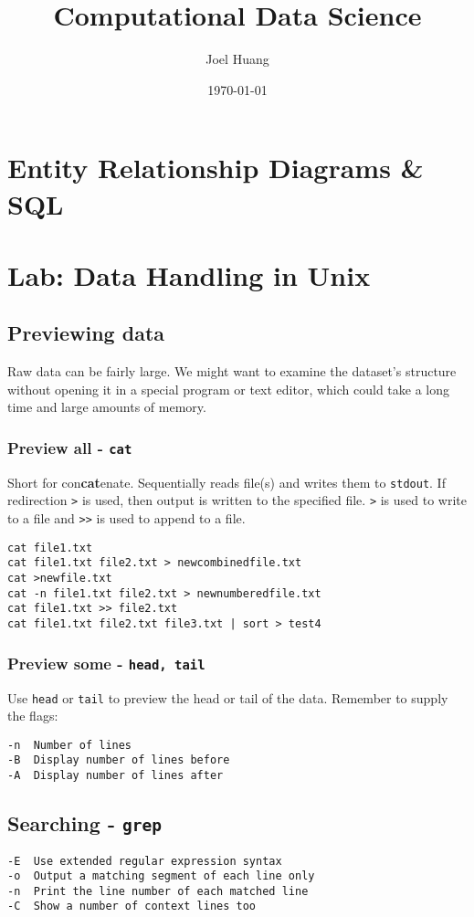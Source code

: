\documentclass[9pt,twocolumn]{article}
\title{
	Computational Data Science
}
\author{Joel Huang}
\date{\today}
\begin{document}
\maketitle

\section{Entity Relationship Diagrams \& SQL}



\section{Lab: Data Handling in Unix}

\subsection*{Previewing data}
Raw data can be fairly large. We might want to examine the dataset's structure without opening it in a special program or text editor, which could take a long time and large amounts of memory.

\subsubsection*{Preview all - \lstinline{cat}}
Short for con\textbf{cat}enate. Sequentially reads file(s) and writes them to \lstinline{stdout}. If redirection \lstinline{>} is used, then output is written to the specified file. \lstinline{>} is used to write to a file and \lstinline{>>} is used to append to a file.
\begin{lstlisting}
cat file1.txt
cat file1.txt file2.txt > newcombinedfile.txt
cat >newfile.txt
cat -n file1.txt file2.txt > newnumberedfile.txt
cat file1.txt >> file2.txt
cat file1.txt file2.txt file3.txt | sort > test4
\end{lstlisting}

\subsubsection*{Preview some - \lstinline{head, tail}}
Use \lstinline{head} or \lstinline{tail} to preview the head or tail of the data. Remember to supply the flags:
\begin{lstlisting}
-n  Number of lines
-B  Display number of lines before
-A  Display number of lines after
\end{lstlisting}

\subsection*{Searching - \lstinline{grep}}
\begin{lstlisting}
-E  Use extended regular expression syntax
-o  Output a matching segment of each line only
-n  Print the line number of each matched line
-C  Show a number of context lines too
\end{lstlisting}
\end{document}
